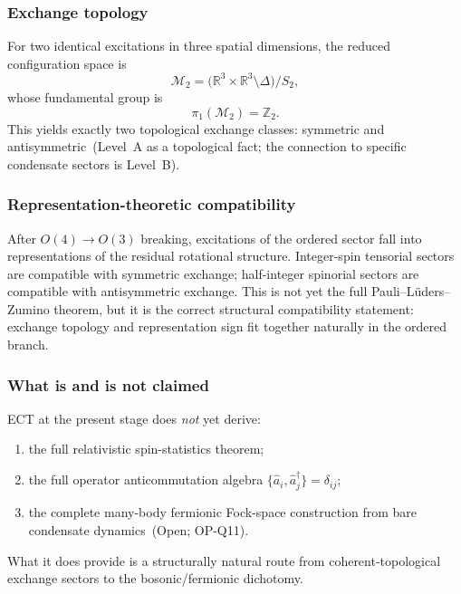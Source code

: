 \subsubsection*{Exchange topology}

For two identical excitations in three spatial dimensions, the reduced
configuration space is
\begin{equation}
  \label{eq:qs_exchange_space}
  \mathcal{M}_2
  =
  \bigl(\mathbb{R}^3\times\mathbb{R}^3\setminus\Delta\bigr)/S_2,
\end{equation}
whose fundamental group is
\begin{equation}
  \label{eq:qs_exchange_pi1}
  \pi_1(\mathcal{M}_2) = \mathbb{Z}_2.
\end{equation}
This yields exactly two topological exchange classes: symmetric and
antisymmetric~(Level~A as a topological fact; the connection to
specific condensate sectors is Level~B).

\subsubsection*{Representation-theoretic compatibility}

After $O(4)\to O(3)$ breaking, excitations of the ordered sector fall
into representations of the residual rotational structure.
Integer-spin tensorial sectors are compatible with symmetric exchange;
half-integer spinorial sectors are compatible with antisymmetric
exchange.
This is not yet the full Pauli--L\"uders--Zumino theorem, but it is
the correct structural compatibility statement: exchange topology and
representation sign fit together naturally in the ordered branch.

\subsubsection*{What is and is not claimed}

ECT at the present stage does \emph{not} yet derive:
\begin{enumerate}[label=(\roman*)]
  \item the full relativistic spin-statistics theorem;
  \item the full operator anticommutation algebra
    $\{\hat a_i,\hat a_j^\dagger\}=\delta_{ij}$;
  \item the complete many-body fermionic Fock-space construction
    from bare condensate dynamics~(Open; OP-Q11).
\end{enumerate}
What it does provide is a structurally natural route from
coherent-topological exchange sectors to the bosonic/fermionic
dichotomy.

